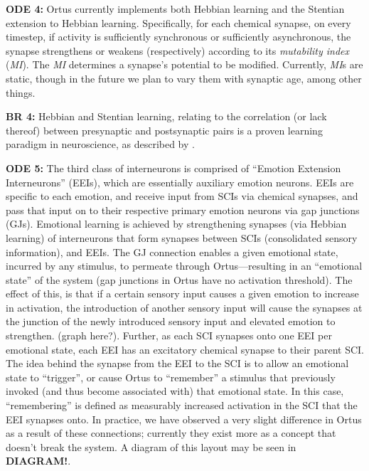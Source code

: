 \documentclass[letterpaper]{article}
\begin{document}
\textbf{ODE 4:} Ortus currently implements both Hebbian learning and the Stentian extension to Hebbian learning. Specifically, for each chemical synapse, on every timestep, if activity is sufficiently synchronous or sufficiently asynchronous, the synapse strengthens or weakens (respectively) according to its \textit{mutability index} (\textit{MI}). The \textit{MI} determines a synapse's potential to be modified. Currently, \textit{MI}s are static, though in the future we plan to vary them with synaptic age, among other things.

\textbf{BR 4:} Hebbian and Stentian learning, relating to the correlation (or lack thereof) between presynaptic and postsynaptic pairs is a proven learning paradigm in neuroscience, as described by \citet{Kutsarova2016}.



\textbf{ODE 5:} The third class of interneurons is comprised of ``Emotion Extension Interneurons'' (EEIs), which are essentially auxiliary emotion neurons.
EEIs are specific to each emotion, and receive input from SCIs via chemical synapses, and pass that input on to their respective primary emotion neurons via gap junctions (GJs).
Emotional learning is achieved by strengthening synapses (via Hebbian learning) of interneurons that form synapses between SCIs (consolidated sensory information), and EEIs.
The GJ connection enables a given emotional state, incurred by any stimulus, to permeate through Ortus---resulting in an ``emotional state'' of the system (gap junctions in Ortus have no activation threshold).
The effect of this, is that if a certain sensory input causes a given emotion to increase in activation, the introduction of another sensory input will cause the synapses at the junction of the newly introduced sensory input and elevated emotion to strengthen. (graph here?). 
Further, as each SCI synapses onto one EEI per emotional state, each EEI has an excitatory chemical synapse to their parent SCI.
The idea behind the synapse from the EEI to the SCI is to allow an emotional state to ``trigger'', or cause Ortus to ``remember'' a stimulus that previously invoked (and thus become associated with) that emotional state.
In this case, ``remembering'' is defined as measurably increased activation in the SCI that the EEI synapses onto.
In practice, we have observed a very slight difference in Ortus as a result of these connections; currently they exist more as a concept that doesn't break the system. A diagram of this layout may be seen in \textbf{DIAGRAM!}.
\end{document}
